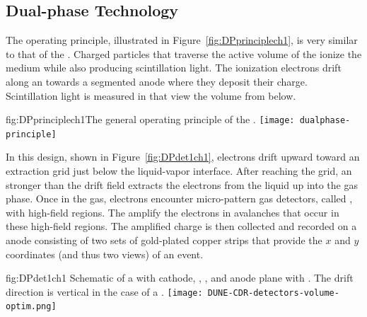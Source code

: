 \FloatBarrier
\subsection{Dual-phase Technology}
\label{sec:fddp-exec-splar}

The  operating principle, illustrated in Figure~\ref{fig:DPprinciplech1}, is very similar to that of the . %
 Charged particles that traverse the active volume of the  ionize the medium while also producing scintillation light.  The ionization electrons drift along an \efield towards a segmented anode where they deposit their charge. Scintillation light is measured in  that view the volume from below. %
 
 
\begin{dunefigure}{fig:DPprinciplech1}{The general operating principle of the  .}
\texttt{[image: dualphase-principle]}
\end{dunefigure}

In this design, shown in Figure~\ref{fig:DPdet1ch1}, electrons drift upward toward an extraction grid just below the liquid-vapor interface. 
After reaching the grid, an \efield stronger than the \dpnominaldriftfield{} drift field extracts the electrons from the liquid up into the gas phase. Once in the gas, electrons encounter micro-pattern gas detectors, called , with high-field regions. The  amplify the electrons in avalanches that occur in these high-field regions. The amplified charge is then collected and recorded on a \twod anode
consisting of two sets of %
gold-plated copper strips that provide the $x$ and $y$ coordinates (and thus two views) of an event. 

\begin{dunefigure}{fig:DPdet1ch1}
  {Schematic of a \nominalmodsize {}    with cathode, , , and anode plane with . The drift direction is vertical in the case of a .}
  \texttt{[image: DUNE-CDR-detectors-volume-optim.png]}
\end{dunefigure}

